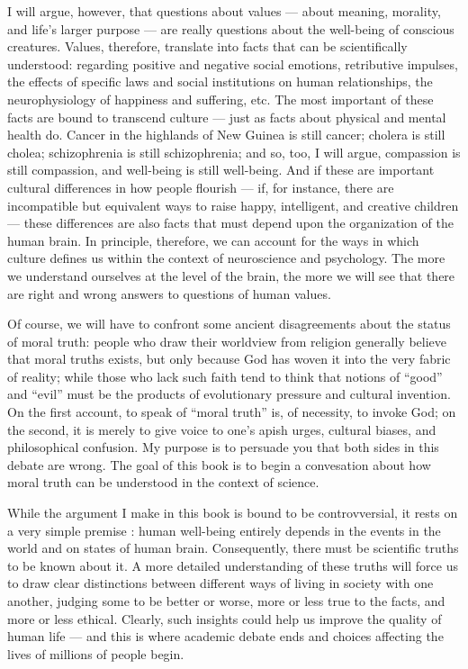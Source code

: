 \documentclass[a4paper,12pt]{extbook}
\begin{document}
I will argue, however, that questions about values --- about meaning, morality, and life's larger purpose --- are really questions about the well-being of conscious creatures.
Values, therefore, translate into facts that can be scientifically understood: regarding positive and negative social emotions, retributive impulses, the effects of specific laws and social institutions on human relationships, the neurophysiology of happiness and suffering, etc.
The most important of these facts are bound to transcend culture --- just as facts about physical and mental health do.
Cancer in the highlands of New Guinea is still cancer;
cholera is still cholea;
schizophrenia is still schizophrenia;
and so, too, I will argue, compassion is still compassion, and well-being is still well-being.
And if these are important cultural differences in how people flourish --- if, for instance, there are incompatible but equivalent ways to raise happy, intelligent, and creative children --- these differences are also facts that must depend upon the organization of the human brain.
In principle, therefore, we can account for the ways in which culture defines us within the context of neuroscience and psychology.
The more we understand ourselves at the level of the brain, the more we will see that there are right and wrong answers to questions of human values.

Of course, we will have to confront some ancient disagreements about the status of moral truth:
people who draw their worldview from religion generally believe that moral truths exists, but only because God has woven it into the very fabric of reality;
while those who lack such faith tend to think that notions of ``good'' and ``evil'' must be the products of evolutionary pressure and cultural invention.
On the first account, to speak of ``moral truth'' is, of necessity, to invoke God;
on the second, it is merely to give voice to one's apish urges, cultural biases, and philosophical confusion.
My purpose is to persuade you that both sides in this debate are wrong.
The goal of this book is to begin a convesation about how moral truth can be understood in the context of science.

While the argument I make in this book is bound to be controvversial, it rests on a very simple premise :
human well-being entirely depends in the events in the world and on states of human brain.
Consequently, there must be scientific truths to be known about it.
A more detailed understanding of these truths will force us to draw clear distinctions between different ways of living in society with one another, judging some to be better or worse, more or less true to the facts, and more or less ethical.
Clearly, such insights could help us improve the quality of human life --- and this is where academic debate ends and choices affecting the lives of millions of people begin.
\end{document}
